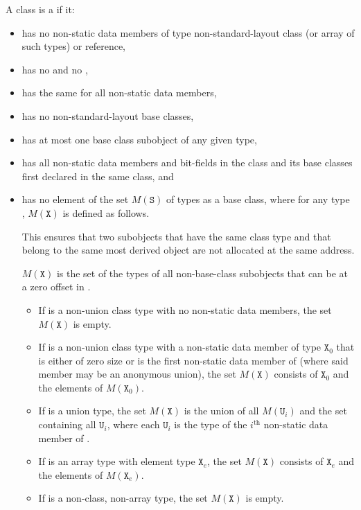 \pnum
A class  is a  if it:
\begin{itemize}
\item has no non-static data members of type non-standard-layout class
(or array of such types) or reference,

\item has no  and no
,

\item has the same 
for all non-static data members,

\item has no non-standard-layout base classes,

\item has at most one base class subobject of any given type,

\item has all non-static data members and bit-fields in the class and
its base classes first declared in the same class, and

\item has no element of the set $M(\mathtt{S})$ of types
as a base class,
where for any type , $M(\mathtt{X})$ is defined as follows.
\begin{footnote}

This ensures that two subobjects that have the same class type and that
belong to the same most derived object are not allocated at the same
address.
\end{footnote}
\begin{note}
$M(\mathtt{X})$ is the set of the types of all non-base-class subobjects
that can be at a zero offset in .
\end{note}

\begin{itemize}
\item If  is a non-union class type with no non-static data members,
the set $M(\mathtt{X})$ is empty.

\item If  is a non-union class type with a non-static data
member of type $\mathtt{X}_0$
that is either of zero size or
is the first non-static data member of 
(where said member may be an anonymous union),
the set $M(\mathtt{X})$ consists of $\mathtt{X}_0$ and the elements of
$M(\mathtt{X}_0)$.

\item If  is a union type, the set $M(\mathtt{X})$ is
the union of all $M(\mathtt{U}_i)$ and the set containing all $\mathtt{U}_i$,
where each $\mathtt{U}_i$ is the type of the $i^\text{th}$ non-static data member
of .

\item If  is an array type with element type $\mathtt{X}_e$,
the set $M(\mathtt{X})$ consists of $\mathtt{X}_e$
and the elements of $M(\mathtt{X}_e)$.

\item If  is a non-class, non-array type, the set $M(\mathtt{X})$ is empty.
\end{itemize}
\end{itemize}


